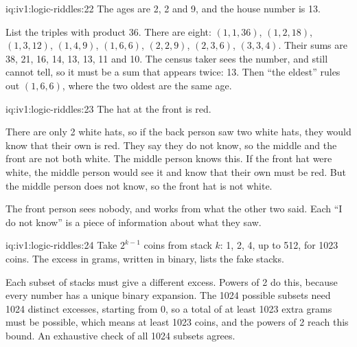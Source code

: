 \enlargethispage{-3\baselineskip}%
\begin{solution}{iq:iv1:logic-riddles:22}
The ages are 2, 2 and 9, and the house number is 13.

List the triples with product 36. There are eight: $(1, 1, 36)$, $(1, 2, 18)$, $(1, 3, 12)$, $(1, 4, 9)$, $(1, 6, 6)$, $(2, 2, 9)$, $(2, 3, 6)$, $(3, 3, 4)$. Their sums are 38, 21, 16, 14, 13, 13, 11 and 10. The census taker sees the number, and still cannot tell, so it must be a sum that appears twice: 13. Then ``the eldest'' rules out $(1, 6, 6)$, where the two oldest are the same age.

\end{solution}

\begin{solution}{iq:iv1:logic-riddles:23}
The hat at the front is red.

There are only 2 white hats, so if the back person saw two white hats, they would know that their own is red. They say they do not know, so the middle and the front are not both white. The middle person knows this. If the front hat were white, the middle person would see it and know that their own must be red. But the middle person does not know, so the front hat is not white.

The front person sees nobody, and works from what the other two said. Each ``I do not know'' is a piece of information about what they saw.

\end{solution}

\begin{solution}{iq:iv1:logic-riddles:24}
Take $2^{k - 1}$ coins from stack $k$: 1, 2, 4, up to 512, for 1023 coins. The excess in grams, written in binary, lists the fake stacks.

Each subset of stacks must give a different excess. Powers of 2 do this, because every number has a unique binary expansion. The 1024 possible subsets need 1024 distinct excesses, starting from 0, so a total of at least 1023 extra grams must be possible, which means at least 1023 coins, and the powers of 2 reach this bound. An exhaustive check of all 1024 subsets agrees.

\end{solution}

